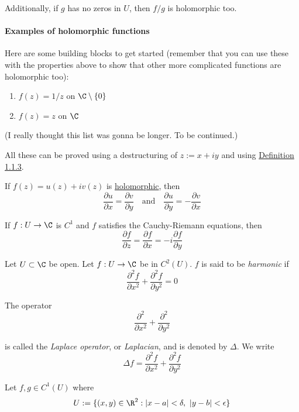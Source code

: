 Additionally, if $g$ has no zeros in $U$, then $f/g$ is holomorphic
too.

\paragraph{Examples of holomorphic functions}

Here are some building blocks to get started (remember that you can
use these with the properties above to show that other more
complicated functions are holomorphic too):

\begin{enumerate}
	\item $f(z)=1/z$ on $\C\setminus\{0\}$
	\item $f(z)=z$ on $\C$
\end{enumerate}

(I really thought this list was gonna be longer. To be continued.)

All these can be proved using a destructuring of $z:=x+iy$ and using
\href{ffea0ed}{Definition 1.1.3}.

\label{fb10fd3}

If $f(z) = u(z) + iv(z)$ is \href{e1e08f7}{holomorphic}, then
$$
	\frac{\partial u}{\partial x}=\frac{\partial v}{\partial y}
	\quad\text{and}\quad
	\frac{\partial u}{\partial y}=-\frac{\partial v}{\partial x}
$$

\label{d507f47}

If $f:U\to\C$ is $C^1$ and $f$ satisfies the Cauchy-Riemann equations,
then
$$
	\frac{\partial f}{\partial z}=\frac{\partial f}{\partial x}=
	-i\frac{\partial f}{\partial y}
$$

\label{d53f60f}

Let $U\subset\C$ be open. Let $f:U\to\C$ be in $C^2(U)$. $f$ is said
to be \textit{harmonic} if
$$
	\frac{\partial^2f}{\partial x^2}+\frac{\partial^2f}{\partial y^2}=0
$$

The operator
$$
	\frac{\partial^2}{\partial x^2}+\frac{\partial^2}{\partial y^2}
$$

is called the \textit{Laplace operator}, or \textit{Laplacian}, and is
denoted by $\Delta$. We write
$$
	\Delta f=\frac{\partial^2f}{\partial x^2}+\frac{\partial^2f}{\partial y^2}
$$

\label{fdd4521}

Let $f,g\in C^1(U)$ where
$$
	U:=\{ (x,y)\in\R^2:|x-a|<\delta,\ |y-b|<\epsilon \}
$$


